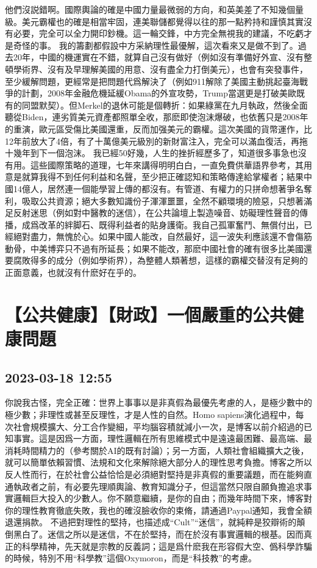 \documentclass[twocolumn]{ctexart}
\begin{document}
他們沒説錯啊。國際輿論的確是中國力量最微弱的方向，和英美差了不知幾個量級。美元霸權也的確是相當牢固，連美聯儲都覺得以往的那一點矜持和謹慎其實沒有必要，完全可以全力開印鈔機。這一輪交鋒，中方完全無視我的建議，不吃虧才是奇怪的事。
我的籌劃都假設中方采納理性最優解，這次看來又是做不到了。過去20年，中國的機運實在不錯，就算自己沒有做好（例如沒有準備好外宣、沒有整頓學術界、沒有及早理解美國的用意、沒有盡全力打倒美元），也會有突發事件，至少緩解問題，更經常是把問題代爲解決了（例如911解除了美國主動挑起臺海戰爭的計劃，2008年金融危機延緩Obama的外宣攻勢，Trump當選更是打破美歐既有的同盟默契）。但Merkel的退休可能是個轉折：如果綠黨在九月執政，然後全面聽從Biden，連劣質美元資產都照單全收，那麽即使泡沫爆破，也依舊只是2008年的重演，歐元區受傷比美國還重，反而加强美元的霸權。這次美國的貨幣運作，比12年前放大了4倍，有了十萬億美元級別的新財富注入，完全可以滿血復活，再拖十幾年到下一個泡沫。
我已經50好幾，人生的挫折經歷多了，知道很多事急也沒有用。這些國際策略的道理，七年來講得明明白白，一直免費供華語界參考，其用意是就算我得不到任何利益和名聲，至少把正確認知和策略傳達給掌權者；結果中國14億人，居然連一個能學習上傳的都沒有。有管道、有權力的只拼命想著爭名奪利，吸取公共資源；絕大多數知識份子渾渾噩噩，全然不顧環境的險惡，只想著滿足反射迷思（例如對中醫教的迷信），在公共論壇上製造噪音、妨礙理性聲音的傳播，成爲改革的絆脚石、既得利益者的貼身護衛。我自己孤軍奮鬥、無償付出，已經絕對盡力，無愧於心。如果中國人能改，自然最好，這一波失利應該還不會傷筋動骨，中美博弈只不過有所延長；如果不能改，那麽中國社會的確有很多比美國還要腐敗得多的成分（例如學術界），為整體人類著想，這樣的霸權交替沒有足夠的正面意義，也就沒有什麽好在乎的。
\section*{【公共健康】【財政】一個嚴重的公共健康問題}
\subsection*{2023-03-18 12:55}

你說我古怪，完全正確：世界上事事以是非真假為最優先考慮的人，是極少數中的極少數；非理性或甚至反理性，才是人性的自然。Homo sapiens演化過程中，每次社會規模擴大、分工合作變細，平均腦容積就減小一次，是博客以前介紹過的已知事實。這是因爲一方面，理性邏輯在所有思維模式中是遠遠最困難、最高端、最消耗時間精力的（參考關於AI的既有討論）；另一方面，人類社會組織擴大之後，就可以簡單依賴習慣、法規和文化來解除絕大部分人的理性思考負擔。博客之所以反人性而行，在於社會公益恰恰是必須絕對堅持是非真假的重要議題，而在能夠直通執政者之前，有必要先理順輿論、教育知識分子，但這當然只限自願負擔追求事實邏輯巨大投入的少數人。你不願意繼續，是你的自由；而幾年時間下來，博客對你的理性教育徹底失敗，我也的確沒臉收你的束脩，請通過Paypal通知，我會全額退還捐款。
不過把對理性的堅持，也描述成“Cult”“迷信”，就純粹是狡辯術的顛倒黑白了。迷信之所以是迷信，不在於堅持，而在於沒有事實邏輯的根基。因而真正的科學精神，先天就是宗教的反義詞；這是爲什麽我在形容假大空、僞科學詐騙的時候，特別不用“科學教”這個Oxymoron，而是“科技教”的考慮。
\end{document}
